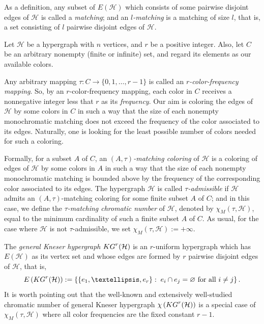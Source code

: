 \documentclass[11pt]{amsart}
\theoremstyle{definition}
\begin{document}
As a definition, any subset of $E({\mathcal{H}})$ which consists of some pairwise disjoint edges of ${\mathcal{H}}$ is called a {\it matching}; and an {\it $l$-matching} is a matching of size
$l$, that is, a set consisting of $l$ pairwise disjoint edges of ${\mathcal{H}}$.


Let ${\mathcal H}$ be a hypergraph with $n$ vertices, and $r$ be a positive integer. Also, let $C$ be an arbitrary nonempty (finite or infinite) set, and regard its elements as our available colors.

\noindent Any arbitrary mapping $\tau: C\longrightarrow \{0,1,\ldots,r-1\}$ is called an {\it $r$-color-frequency mapping}. So, by an $r$-color-frequency mapping, each color in $C$ receives a nonnegative integer less that $r$ as its {\it frequency}. Our aim is coloring the edges of ${\mathcal H}$ by some colors in $C$ in such a way that the size of each nonempty monochromatic matching does not exceed the frequency of the color associated to its edges. Naturally, one is looking for the least possible number of colors needed for such a coloring.

\noindent Formally, for a subset $A$ of $C$, an {\it $(A,\tau)$-matching coloring} of ${\mathcal H}$ is
a coloring of edges of ${\mathcal H}$ by some colors in $A$ in such a way that the size of each nonempty monochromatic matching is bounded above by the frequency of the corresponding color associated to its edges.
The hypergraph ${\mathcal H}$ is called {\it $\tau$-admissible} if ${\mathcal H}$ admits an $(A,\tau)$-matching coloring for some finite subset $A$ of $C$; and in this case, we define the {\it $\tau$-matching chromatic number} of ${\mathcal H}$, denoted by $\chi_M(\tau, {\mathcal H})$, equal to the minimum cardinality of such a finite subset $A$ of $C$. As usual, for the case where ${\mathcal H}$ is not $\tau$-admissible, we set $\chi_M(\tau, {\mathcal H}):=+\infty$.


The {\it general Kneser hypergraph} ${\rm KG}^r({\mathcal H})$ is an $r$-uniform hypergraph which has $E({\mathcal H})$ as its vertex set and  whose edges are formed by $r$ pairwise disjoint edges of ${\mathcal H}$, that is,
$$E\left({\rm KG}^r({\mathcal H})\right) :=\left\{\{e_1,\ldots,e_r\}:\; e_i\cap e_j=\varnothing \mbox{ for all } i\neq j\right\}.$$
It is worth pointing out that the well-known and extensively well-studied chromatic number of general Kneser hypergraph $\chi \left( {\rm KG}^r({\mathcal H}) \right)$ is a special case of $\chi_M(\tau, {\mathcal H})$ where all color frequencies are the fixed constant $r-1$.
\end{document}

